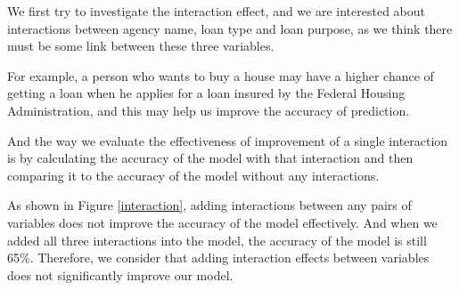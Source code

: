 \documentclass{jpp}
\begin{document}
We first try to investigate the interaction effect, and we are interested about interactions between agency name, loan type and loan purpose, as we think there must be some link between these three variables. 

For example, a person who wants to buy a house may have a higher chance of getting a loan when he applies for a loan insured by the Federal Housing Administration, and this may help us improve the accuracy of prediction.

And the way we evaluate the effectiveness of improvement of a single interaction is by calculating the accuracy of the model with that interaction and then comparing it to the accuracy of the model without any interactions.

As shown in Figure \ref{interaction}, adding interactions between any pairs of variables does not improve the accuracy of the model effectively. And when we added all three interactions into the model, the accuracy of the model is still 65\%. Therefore, we consider that adding interaction effects between variables does not significantly improve our model.
\end{document}
